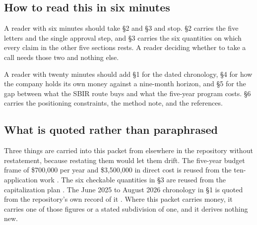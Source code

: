 \subsection{How to read this in six minutes}

A reader with six minutes should take §2 and §3 and stop. §2 carries the five
letters and the single approval step, and §3 carries the six quantities on which
every claim in the other five sections rests. A reader deciding whether to take a
call needs those two and nothing else.

A reader with twenty minutes should add §1 for the dated chronology, §4 for how
the company holds its own money against a nine-month horizon, and §5 for the gap
between what the SBIR route buys and what the five-year program costs. §6 carries
the positioning constraints, the method note, and the references.

\subsection{What is quoted rather than paraphrased}

Three things are carried into this packet from elsewhere in the repository
without restatement, because restating them would let them drift. The five-year
budget frame of \$700,000 per year and \$3,500,000 in direct cost is reused from
the ten-application work \cite{tenapps2026}. The six checkable quantities in §3
are reused from the capitalization plan \cite{capitalplan2026}. The June 2025 to
August 2026 chronology in §1 is quoted from the repository's own record of it
\cite{daraxstory2026}. Where this packet carries money, it carries one of those
figures or a stated subdivision of one, and it derives nothing new.
